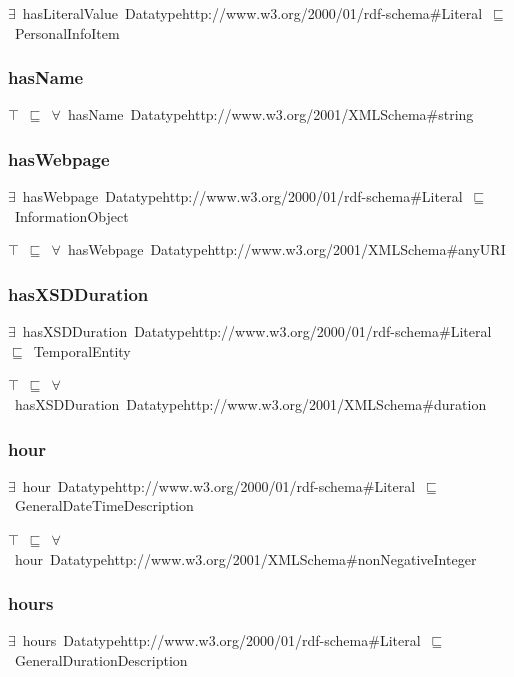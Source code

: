 \documentclass{article}
\begin{document}
\ensuremath{\exists}~hasLiteralValue~Datatypehttp://www.w3.org/2000/01/rdf-schema#Literal~\ensuremath{\sqsubseteq}~PersonalInfoItem

\subsubsection*{hasName}

\ensuremath{\top}~\ensuremath{\sqsubseteq}~\ensuremath{\forall}~hasName~Datatypehttp://www.w3.org/2001/XMLSchema#string

\subsubsection*{hasWebpage}

\ensuremath{\exists}~hasWebpage~Datatypehttp://www.w3.org/2000/01/rdf-schema#Literal~\ensuremath{\sqsubseteq}~InformationObject

\ensuremath{\top}~\ensuremath{\sqsubseteq}~\ensuremath{\forall}~hasWebpage~Datatypehttp://www.w3.org/2001/XMLSchema#anyURI

\subsubsection*{hasXSDDuration}

\ensuremath{\exists}~hasXSDDuration~Datatypehttp://www.w3.org/2000/01/rdf-schema#Literal~\ensuremath{\sqsubseteq}~TemporalEntity

\ensuremath{\top}~\ensuremath{\sqsubseteq}~\ensuremath{\forall}~hasXSDDuration~Datatypehttp://www.w3.org/2001/XMLSchema#duration

\subsubsection*{hour}

\ensuremath{\exists}~hour~Datatypehttp://www.w3.org/2000/01/rdf-schema#Literal~\ensuremath{\sqsubseteq}~GeneralDateTimeDescription

\ensuremath{\top}~\ensuremath{\sqsubseteq}~\ensuremath{\forall}~hour~Datatypehttp://www.w3.org/2001/XMLSchema#nonNegativeInteger

\subsubsection*{hours}

\ensuremath{\exists}~hours~Datatypehttp://www.w3.org/2000/01/rdf-schema#Literal~\ensuremath{\sqsubseteq}~GeneralDurationDescription
\end{document}
